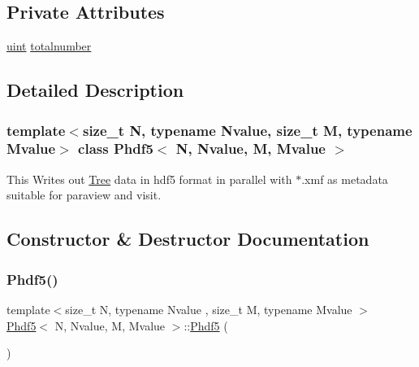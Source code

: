 \subsection*{Private Attributes}
\begin{DoxyCompactItemize}
\item 
\mbox{\hyperlink{definitions_8h_a69aa29b598b851b0640aa225a9e5d61d}{uint}} \mbox{\hyperlink{classPhdf5_a4bb1cd4f86aac47741578a1d904ce2b0}{totalnumber}}
\end{DoxyCompactItemize}


\subsection{Detailed Description}
\subsubsection*{template$<$size\+\_\+t N, typename Nvalue, size\+\_\+t M, typename Mvalue$>$\newline
class Phdf5$<$ N, Nvalue, M, Mvalue $>$}

This Writes out \mbox{\hyperlink{classTree}{Tree}} data in hdf5 format in parallel with $\ast$.xmf as metadata suitable for paraview and visit. 

\subsection{Constructor \& Destructor Documentation}
\mbox{\label{classPhdf5_afc8ea2b7a2dfa770d5dec38e8b9f8d91}} 
\subsubsection{\texorpdfstring{Phdf5()}{Phdf5()}}
{\footnotesize\ttfamily template$<$size\+\_\+t N, typename Nvalue , size\+\_\+t M, typename Mvalue $>$ \\
\mbox{\hyperlink{classPhdf5}{Phdf5}}$<$ N, Nvalue, M, Mvalue $>$\+::\mbox{\hyperlink{classPhdf5}{Phdf5}} (\begin{DoxyParamCaption}{ }\end{DoxyParamCaption})\hspace{0.3cm}{\ttfamily [inline]}}

\mbox{\label{classPhdf5_aeff77d62aae395bc368d2baa132ac3f0}} 
